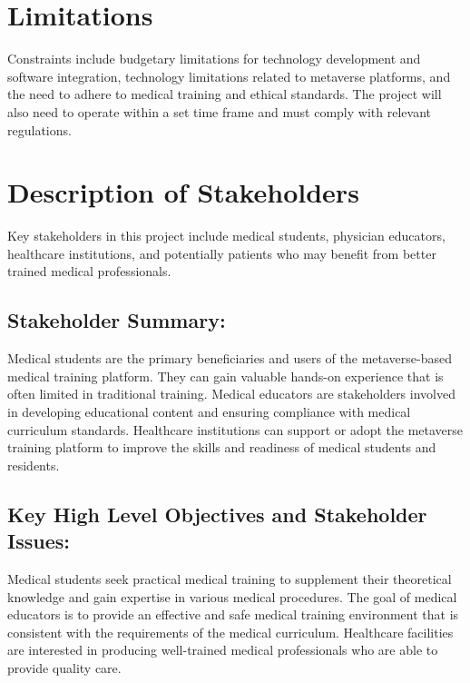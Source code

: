 \section{Limitations}
Constraints include budgetary limitations for technology development and software integration, technology limitations related to metaverse platforms, and the need to adhere to medical training and ethical standards. The project will also need to operate within a set time frame and must comply with relevant regulations.

\section{Description of Stakeholders}
Key stakeholders in this project include medical students, physician educators, healthcare institutions, and potentially patients who may benefit from better trained medical professionals.

\subsection{Stakeholder Summary:}
Medical students are the primary beneficiaries and users of the metaverse-based medical training platform. They can gain valuable hands-on experience that is often limited in traditional training.
Medical educators are stakeholders involved in developing educational content and ensuring compliance with medical curriculum standards.
Healthcare institutions can support or adopt the metaverse training platform to improve the skills and readiness of medical students and residents.
\subsection{Key High Level Objectives and Stakeholder Issues:}
Medical students seek practical medical training to supplement their theoretical knowledge and gain expertise in various medical procedures.
The goal of medical educators is to provide an effective and safe medical training environment that is consistent with the requirements of the medical curriculum.
Healthcare facilities are interested in producing well-trained medical professionals who are able to provide quality care.